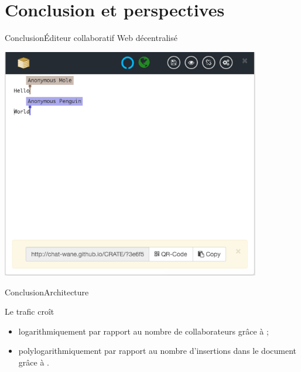 \section{Conclusion et perspectives}

\begin{frame}{Conclusion}{Éditeur collaboratif Web décentralisé}
  
  \begin{center}
    \includegraphics[width=0.85\textwidth]{img/cratescreenshot.png}
  \end{center}

\end{frame}


\begin{frame}{Conclusion}{Architecture}

    \begin{center}
      
    \end{center}
    
    Le trafic croît 
    \begin{itemize}
    \item logarithmiquement par rapport au nombre de collaborateurs grâce à \SPRAY;
    \item polylogarithmiquement par rapport au nombre d'insertions dans le
      document grâce à \LSEQ.
    \end{itemize}

\end{frame}


